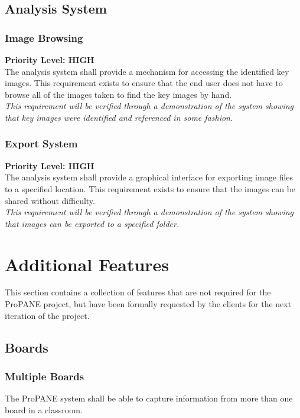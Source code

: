 \documentclass[]{article}
\begin{document}
		\subsection{Analysis System}
		
			
			\subsubsection{Image Browsing}
				\textbf{Priority Level: HIGH}\\
				The analysis system shall provide a mechanism for accessing the identified key images. This requirement exists to ensure that the end user does not have to browse all of the images taken to find the key images by hand.\\
				\emph{This requirement will be verified through a demonstration of the system showing that key images were identified and referenced in some fashion.}
				
			\subsubsection{Export System}
				\textbf{Priority Level: HIGH}\\
				The analysis system shall provide a graphical interface for exporting image files to a specified location. This requirement exists to ensure that the images can be shared without difficulty.\\
				\emph{This requirement will be verified through a demonstration of the system showing that images can be exported to a specified folder.}
				
				
	\section{Additional Features}
		This section contains a collection of features that are not required for the ProPANE project, but have been formally requested by the clients for the next iteration of the project.
		
		
		\subsection{Boards}
			\subsubsection{Multiple Boards}
				The ProPANE system shall be able to capture information from more than one board in a classroom.
			
\end{document}
